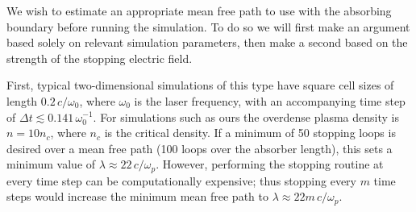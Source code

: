 \documentclass[../absorber.tex]{subfiles}
\begin{document}
We wish to estimate an appropriate mean free path to use with the absorbing boundary before running the simulation.  To do so we will first make an argument based solely on relevant simulation parameters, then make a second based on the strength of the stopping electric field.

First, typical two-dimensional simulations of this type have square cell sizes of length $0.2\,c/\omega_0$, where $\omega_0$ is the laser frequency, with an accompanying time step of $\Delta t \lesssim 0.141\, \omega_0^{-1}$.  For simulations such as ours the overdense plasma density is $n=10n_c$, where $n_c$ is the critical density.  If a minimum of 50 stopping loops is desired over a mean free path (100 loops over the absorber length), this sets a minimum value of $\lambda \approx 22\,c/\omega_p$.  However, performing the stopping routine at every time step can be computationally expensive; thus stopping every $m$ time steps would increase the minimum mean free path to $\lambda \approx 22m\,c/\omega_p$.


\end{document}
